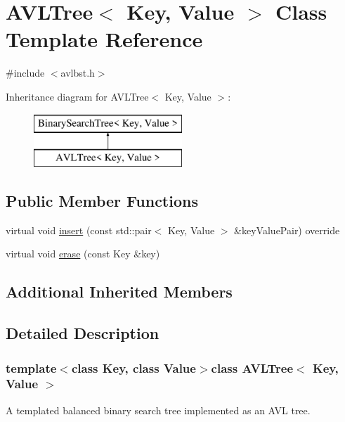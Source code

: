 \hypertarget{classAVLTree}{\section{A\-V\-L\-Tree$<$ Key, Value $>$ Class Template Reference}
\label{classAVLTree}
}


{\ttfamily \#include $<$avlbst.\-h$>$}

Inheritance diagram for A\-V\-L\-Tree$<$ Key, Value $>$\-:\begin{figure}[H]
\begin{center}
\leavevmode
\includegraphics[height=2.000000cm]{classAVLTree}
\end{center}
\end{figure}
\subsection*{Public Member Functions}
\begin{DoxyCompactItemize}
\item 
virtual void \hyperlink{classAVLTree_a7a133667454794bc8fe84beb91fc7f9a}{insert} (const std\-::pair$<$ Key, Value $>$ \&key\-Value\-Pair) override
\item 
virtual void \hyperlink{classAVLTree_a52c0c85de9cbd8f0d30853fc8a853014}{erase} (const Key \&key)
\end{DoxyCompactItemize}
\subsection*{Additional Inherited Members}


\subsection{Detailed Description}
\subsubsection*{template$<$class Key, class Value$>$class A\-V\-L\-Tree$<$ Key, Value $>$}

A templated balanced binary search tree implemented as an A\-V\-L tree. 

